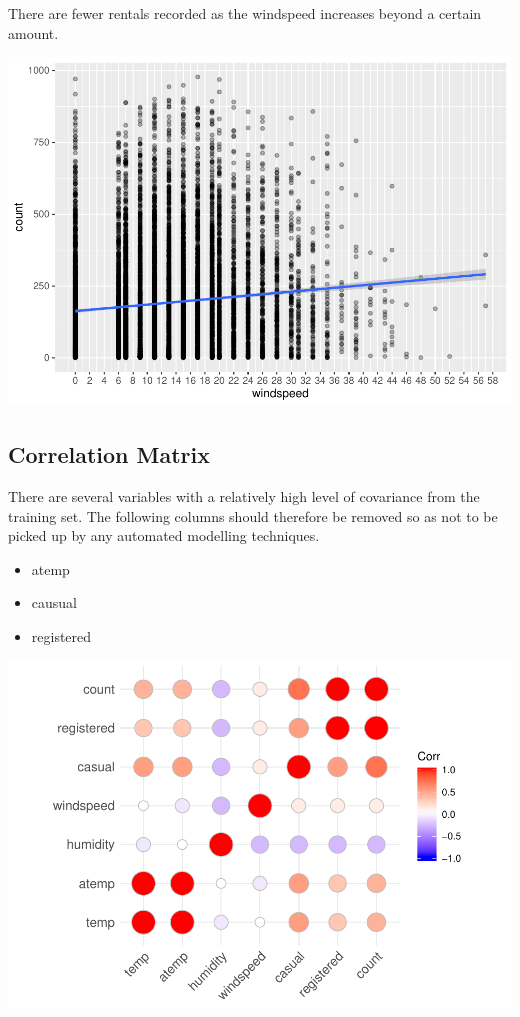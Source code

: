 \documentclass[american,]{article}
\providecommand{\tightlist}{%
  \setlength{\itemsep}{0pt}\setlength{\parskip}{0pt}}
\begin{document}
There are fewer rentals recorded as the windspeed increases beyond a certain amount.

\includegraphics{BikeSharingDemand_files/figure-latex/train.mod.1.windspeed-1.pdf}

\newpage

\hypertarget{correlation-matrix}{%
\subsection{Correlation Matrix}\label{correlation-matrix}}

There are several variables with a relatively high level of covariance from the training set. The following columns should therefore be removed so as not to be picked up by any automated modelling techniques.

\begin{itemize}
\tightlist
\item
  atemp
\item
  causual
\item
  registered
\end{itemize}

\includegraphics{BikeSharingDemand_files/figure-latex/train.mod.1.corr.matrix-1.pdf}
\end{document}
